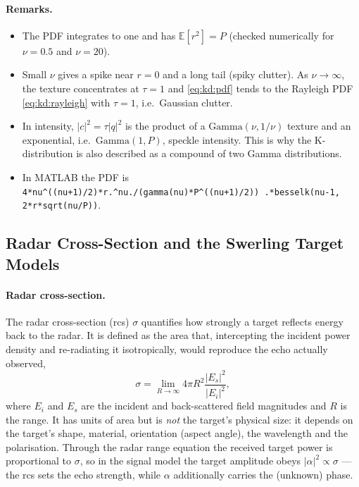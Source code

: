 \documentclass{article}
\begin{document}
\paragraph{Remarks.}
\begin{itemize}
  \item The PDF integrates to one and has $\mathbb E[r^2]=P$ (checked
        numerically for $\nu=0.5$ and $\nu=20$).
  \item Small $\nu$ gives a spike near $r=0$ and a long tail (spiky clutter).
        As $\nu\to\infty$, the texture concentrates at $\tau=1$ and
        \eqref{eq:kd:pdf} tends to the Rayleigh PDF
        \eqref{eq:kd:rayleigh} with $\tau=1$, i.e.\ Gaussian clutter.
  \item In intensity, $|c|^2=\tau|q|^2$ is the product of a
        $\mathrm{Gamma}(\nu,1/\nu)$ texture and an exponential, i.e.\
        $\mathrm{Gamma}(1,P)$, speckle intensity. This is why the
        K-distribution is also described as a compound of two Gamma
        distributions.
  \item In MATLAB the PDF is
        \texttt{4*nu\^{}((nu+1)/2)*r.\^{}nu./(gamma(nu)*P\^{}((nu+1)/2))
        .*besselk(nu-1, 2*r*sqrt(nu/P))}.
\end{itemize}

\subsection{Radar Cross-Section and the Swerling Target Models}
\label{rcs}

\paragraph{Radar cross-section.}
The radar cross-section (\gls{rcs}) $\sigma$ quantifies how strongly a target reflects energy back to the radar. It is defined as the area that, intercepting the incident power density and re-radiating it isotropically, would reproduce the echo actually observed, $$\sigma=\lim_{R\to\infty}4\pi R^2\frac{|E_s|^2}{|E_i|^2},$$ where $E_i$ and $E_s$ are the incident and back-scattered field magnitudes and $R$ is the range. It has units of area but is \emph{not} the target's physical size: it depends on the target's shape, material, orientation (aspect angle), the wavelength and the polarisation. Through the radar range equation the received target power is proportional to $\sigma$, so in the signal model the target amplitude obeys $|\alpha|^2\propto\sigma$ --- the \gls{rcs} sets the echo strength, while $\alpha$ additionally carries the (unknown) phase.
\end{document}
